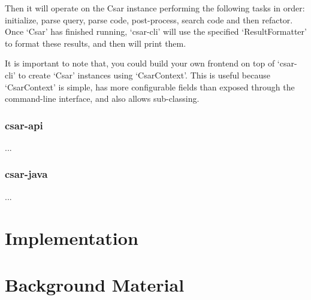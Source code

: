 \documentclass[12pt, letterpaper]{article}
\begin{document}
Then it will operate on the Csar instance performing the following tasks in order: initialize, parse query, parse code, post-process, search code and then refactor.
Once `Csar' has finished running, `csar-cli' will use the specified `ResultFormatter' to format these results, and then will print them.

It is important to note that, you could build your own frontend on top of `csar-cli' to create `Csar' instances using `CsarContext'.
This is useful because `CsarContext' is simple, has more configurable fields than exposed through the command-line interface, and also allows sub-classing.

\subsubsection{csar-api}
...

\subsubsection{csar-java}
...

\section{Implementation}

\section{Background Material}
\end{document}
